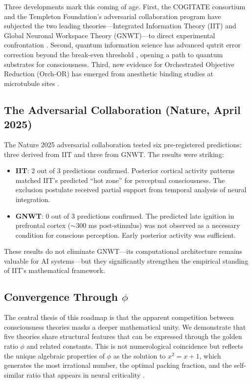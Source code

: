\documentclass[12pt,a4paper]{article}
\begin{document}
Three developments mark this coming of age. First, the COGITATE consortium and
the Templeton Foundation's adversarial collaboration program have subjected the
two leading theories---Integrated Information Theory (IIT) and Global Neuronal
Workspace Theory (GNWT)---to direct experimental confrontation
\cite{Nature2025Adversarial}. Second, quantum information science has advanced
qutrit error correction beyond the break-even threshold \cite{Nature2025Qutrits},
opening a path to quantum substrates for consciousness. Third, new evidence for
Orchestrated Objective Reduction (Orch-OR) has emerged from anesthetic binding
studies at microtubule sites \cite{Wiest2025}.

\subsection{The Adversarial Collaboration (Nature, April 2025)}

The Nature 2025 adversarial collaboration tested six pre-registered predictions:
three derived from IIT and three from GNWT. The results were striking:

\begin{itemize}[leftmargin=2em]
  \item \textbf{IIT}: 2 out of 3 predictions confirmed. Posterior cortical
    activity patterns matched IIT's predicted ``hot zone'' for perceptual
    consciousness. The exclusion postulate received partial support from
    temporal analysis of neural integration.
  \item \textbf{GNWT}: 0 out of 3 predictions confirmed. The predicted
    late ignition in prefrontal cortex ($\sim$300 ms post-stimulus)
    was not observed as a necessary condition for conscious perception.
    Early posterior activity was sufficient.
\end{itemize}

\noindent
These results do not eliminate GNWT---its computational architecture remains
valuable for AI systems---but they significantly strengthen the empirical
standing of IIT's mathematical framework.

\subsection{Convergence Through $\phi$}

The central thesis of this roadmap is that the apparent competition between
consciousness theories masks a deeper mathematical unity. We demonstrate that
five theories share structural features that can be expressed through the golden
ratio $\phi$ and related constants. This is not numerological coincidence but
reflects the unique algebraic properties of $\phi$ as the solution to
$x^2 = x + 1$, which generates the most irrational number, the optimal
packing fraction, and the self-similar ratio that appears in neural
criticality \cite{Penrose2014}.
\end{document}
